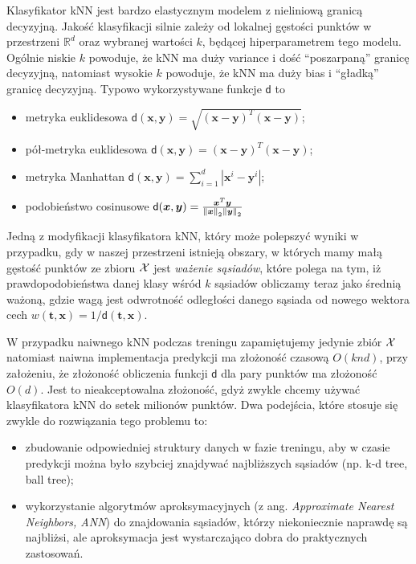 \documentclass{myclass}
\numberwithin{equation}{subsection}
\begin{document}
Klasyfikator kNN jest bardzo elastycznym modelem z nieliniową granicą decyzyjną. Jakość klasyfikacji
silnie zależy od lokalnej gęstości punktów w przestrzeni \(\mathbb{R}^d\) oraz wybranej wartości
\(k\), będącej hiperparametrem tego modelu. Ogólnie niskie \(k\) powoduje, że kNN ma duży variance i
dość \enquote{poszarpaną} granicę decyzyjną, natomiast wysokie \(k\) powoduje, że kNN ma duży bias i
\enquote{gładką} granicę decyzyjną. Typowo wykorzystywane funkcje \(\mathsf{d}\) to
\begin{itemize}
    \item metryka euklidesowa \(\mathsf{d}(\bm{x},\bm{y}) = \sqrt{(\bm{x} - \bm{y})^T(\bm{x} -
    \bm{y})}\);

    \item pół-metryka euklidesowa \(\mathsf{d}(\bm{x},\bm{y}) = (\bm{x} - \bm{y})^T(\bm{x} -
    \bm{y})\);

    \item metryka Manhattan \(\mathsf{d}(\bm{x}, \bm{y}) = \sum_{i=1}^d |\bm{x}^i - \bm{y}^i|\);
    
    \item podobieństwo cosinusowe \(\mathsf{d}(\bm{x}, \bm{y}) =
    \frac{\bm{x}^T\bm{y}}{\norm{\bm{x}}_2 \norm{\bm{y}}_2}\)
\end{itemize}

Jedną z modyfikacji klasyfikatora kNN, który może polepszyć wyniki w przypadku, gdy w naszej
przestrzeni istnieją obszary, w których mamy małą gęstość punktów ze zbioru \(\mathcal{X}\) jest
\emph{ważenie sąsiadów}, które polega na tym, iż prawdopodobieństwa danej klasy wśród \(k\) sąsiadów
obliczamy teraz jako średnią ważoną, gdzie wagą jest odwrotność odległości danego sąsiada od nowego
wektora cech \(w(\bm{t}, \bm{x}) = 1 / \mathsf{d}(\bm{t}, \bm{x})\).

W przypadku naiwnego kNN podczas treningu zapamiętujemy jedynie zbiór \(\mathcal{X}\) natomiast naiwna
implementacja predykcji ma złożoność czasową \(O(knd)\), przy założeniu, że złożoność obliczenia
funkcji \(\mathsf{d}\) dla pary punktów ma złożoność \(O(d)\). Jest to nieakceptowalna złożoność,
gdyż zwykle chcemy używać klasyfikatora kNN do setek milionów punktów. Dwa podejścia, które stosuje
się zwykle do rozwiązania tego problemu to: 
\begin{itemize}

    \item zbudowanie odpowiedniej struktury danych w fazie treningu, aby w czasie predykcji można
    było szybciej znajdywać najbliższych sąsiadów (np. k-d tree, ball tree);

    \item wykorzystanie algorytmów aproksymacyjnych (z ang. \textit{Approximate Nearest Neighbors,
    ANN}) do znajdowania sąsiadów, którzy niekoniecznie naprawdę są najbliżsi, ale aproksymacja jest
    wystarczająco dobra do praktycznych zastosowań.

\end{itemize}
\end{document}
